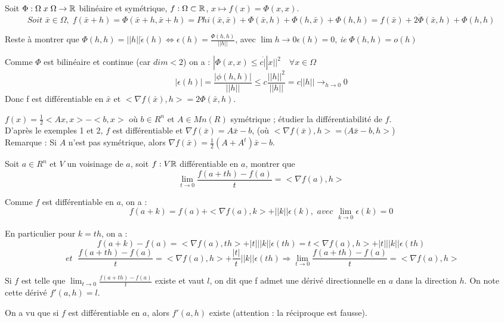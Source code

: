 		\begin{exemple}
		
		Soit $\Phi : \Omega \; x \; \Omega \rightarrow \mathbb{R}$ bilinéaire et symétrique, $f: \Omega \subset \mathbb{R}$, $x \mapsto f(x) = \Phi(x, x)$.
		\[\textit{Soit }\bar{x} \in \Omega, \; f(\bar{x}+h) = \Phi(\bar{x}+h, \bar{x}+h) = Phi(\bar{x}, \bar{x}) + \Phi(\bar{x}, h) + \Phi(h, \bar{x}) + \Phi(h, h) = f(\bar{x}) + 2 \dot \Phi(\bar{x}, h) + \Phi(h, h)\]
		
		Reste à montrer que $\Phi(h, h) = ||h|| \dot \epsilon (h) \Leftrightarrow \epsilon (h) = \frac{ \Phi(h, h) }{ ||h|| }$, avec $\lim{h \rightarrow 0} \epsilon (h) = 0$, \textit{ie} $\Phi(h, h) = o(h)$
		
		Comme $\Phi$ est bilinéaire et continue (car $dim < 2$) on a : $| \Phi (x, x) \leq c \dot ||x||^2\quad \forall x\in\Omega$
		\[| \epsilon (h) | = \frac{ |\phi(h,h)| }{ ||h|| } \leq c \frac{ ||h||^2 }{ ||h|| } = c ||h|| \rightarrow_{h \rightarrow 0} 0\]
		Donc f est différentiable en $\bar{x}$ et $<\nabla f(\bar{x}), h> = 2 \Phi( \bar{x}, h)$.
		\end{exemple}
		
		\begin{exemple}
		
		$f(x) = \frac{1}{2} <Ax, x> - <b, x>$ où $b \in R^n$ et $A \in Mn(R)$ symétrique ; étudier la différentiabilité de $f$.\\
		D'après le exemples 1 et 2, $f$ est différentiable et $\nabla f(\bar{x}) = A \bar{x} - b$, (où $<\nabla f(\bar{x}), h> = (A \bar{x} -b, h>$)\\		
		Remarque : Si $A$ n'est pas symétrique, alors $\nabla f(\bar{x}) = \frac{1}{2} (A+A^t) \bar{x} - b$.
		\end{exemple}
		
		\begin{exemple}
		
		Soit $a \in R^n$ et $V$ un voisinage de $a$, soit $f:V \mathbb{R}$ différentiable en $a$, montrer que \[ \lim_{t \rightarrow 0} \frac{ f(a+th) - f(a) }{ t } = <\nabla f(a), h>\]
		
		Comme $f$ est différentiable en $a$, on a : \[f(a+k) = f(a) + <\nabla f(a), k> + ||k|| \epsilon (k), \textit{ avec }\lim_{k \rightarrow 0} \epsilon (k) = 0\]
		
		En particulier pour $k=th$, on a : \[f(a+k) - f(a) = <\nabla f(a), th> + |t| ||k|| \epsilon (th) =  t <\nabla f(a), h> + |t| ||k|| \epsilon (th)\]
		\[\textit{ et }\;\frac{ f(a+th) - f(a) }{ t } = <\nabla f(a), h> + \frac{|t|}{t} ||k|| \epsilon (th) \Rightarrow \lim_{t \rightarrow 0} \frac{ f(a+th) - f(a) }{ t } = < \nabla f(a), h>\]
		
		Si $f$ est telle que $\lim_{t \rightarrow 0} \frac{ f(a+th)-f(a) }{t}$ existe et vaut $l$, on dit que f admet une dérivé directionnelle en $a$ dans la direction $h$. On note cette dérivé $f'(a, h) = l$.
		
		On a vu que si $f$ est différentiable en $a$, alors $f'(a, h)$ existe (attention : la réciproque est fausse).
		\end{exemple}
		
